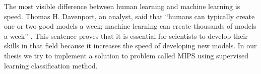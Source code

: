 The most visible difference between human learning and machine learning is speed. 
Thomas H. Davenport, an analyst, said that ``humans can typically create one or two good models a week; machine learning can create thousands of models a week'' \cite{machine_learning}.
This sentence proves that it is essential for scientists to develop their skills in that field because it increases the speed of developing new models.
In our thesis we try to implement a solution to problem called MIPS using supervised learning classification method.
